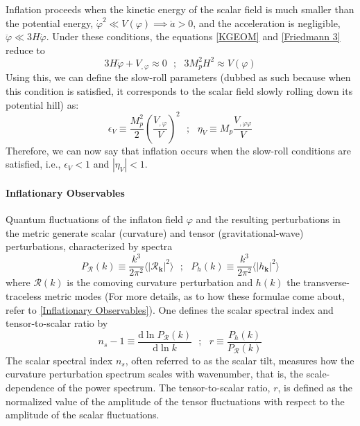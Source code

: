 \documentclass[aps,prd,reprint,preprintnumbers,showpacs,floatfix,nofootinbib,superscript address]{revtex4-2}
\begin{document}

Inflation proceeds when the kinetic energy of the scalar field is much smaller than the potential energy, $\dot{\varphi}^2 \ll V(\varphi) \implies \ddot{a} > 0$, and the acceleration is negligible, $\ddot{\varphi} \ll 3H\dot{\varphi}$. Under these conditions, the equations \cref{KGEOM} and \cref{Friedmann 3} reduce to
\begin{equation}
    3H\dot{\varphi} + V_{,\varphi} \approx 0 \,\,\,\,;\,\,\,\, 3M_p^2H^2 \approx V(\varphi)
\end{equation}
Using this, we can define the slow-roll parameters (dubbed as such because when this condition is satisfied, it corresponds to the scalar field slowly rolling down its potential hill) as:
\begin{equation} \label{Slow roll parameters}
    \epsilon_V \equiv \frac{M_p^2}{2} \left(\frac{V_{,\varphi}}{V} \right)^2 \,\,\,\,;\,\,\,\, \eta_V \equiv M_p \frac{V_{,\varphi \varphi}}{V} 
\end{equation}
Therefore, we can now say that inflation occurs when the slow-roll conditions are satisfied, i.e., $\epsilon_V < 1$ and $|\eta_V|< 1$.

\paragraph{Inflationary Observables} 
Quantum fluctuations of the inflaton field $\varphi$ and the resulting perturbations in the metric generate scalar (curvature) and tensor (gravitational-wave) perturbations, characterized by spectra
\begin{equation}
    P_\mathcal{R}(k) \equiv \frac{k^3}{2\pi^2} \langle| \mathcal{R}_{\bm{k}}|^2 \rangle \,\,\,\,;\,\,\,\, P_h(k) \equiv \frac{k^3}{2\pi^2} \langle| h_{\bm{k}}|^2 \rangle
\end{equation}
where $\mathcal{R}(k)$ is the comoving curvature perturbation and $h(k)$ the transverse-traceless metric modes (For more details, as to how these formulae come about, refer to \cref{Inflationary Observables}). One defines the scalar spectral index and tensor-to-scalar ratio by
\begin{equation}
    n_s - 1 \equiv \frac{\text{d} \ln P_\mathcal{R}(k) }{\text{d} \ln k} \,\,\,\,;\,\,\,\, r \equiv \frac{P_h(k)}{P_\mathcal{R}(k)}
\end{equation}
The scalar spectral index $n_s$, often referred to as the scalar tilt, measures how the curvature perturbation spectrum scales with wavenumber, that is, the scale-dependence of the power spectrum. The tensor-to-scalar ratio, $r$, is defined as the normalized value of the amplitude of the tensor fluctuations with respect to the amplitude of the scalar fluctuations.
\end{document}
